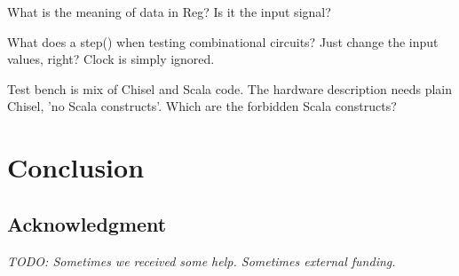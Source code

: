 \documentclass[a4paper, conference]{IEEEtran}
\newcommand{\todo}[1]{{\emph{TODO: #1}}}
\begin{document}
What is the meaning of data in Reg? Is it the input signal?

What does a step() when testing combinational circuits? Just change the input values, right? Clock is simply ignored.

Test bench is mix of Chisel and Scala code. The hardware description needs plain Chisel, 'no Scala constructs'. Which are the forbidden Scala constructs?

\section{Conclusion}
\label{sec:conclusion}


\subsection*{Acknowledgment}

\todo{Sometimes we received some help. Sometimes external funding.}




%


\end{document}
